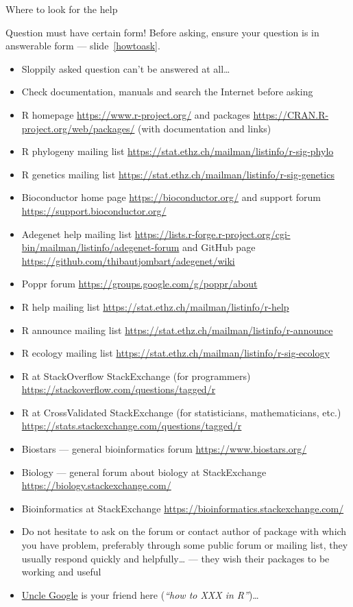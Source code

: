 \documentclass[compress, xelatex, 11pt, xcolor=svgnames, aspectratio=169, url={hyphens, lowtilde}]{beamer}
\begin{document}
\begin{frame}[allowframebreaks]{Where to look for the help}
	\label{help}
	\begin{alertblock}{Question must have certain form!}
			Before asking, \alert{ensure your question is in answerable form} --- slide~\ref{howtoask}.
		\begin{itemize}
			\item Sloppily asked question can't be answered at all\ldots
			\item Check documentation, manuals and search the Internet before asking
		\end{itemize}
	\end{alertblock}
	\begin{itemize}
		\item R homepage \url{https://www.r-project.org/} and packages \url{https://CRAN.R-project.org/web/packages/} (with documentation and links)
		\item R phylogeny mailing list \url{https://stat.ethz.ch/mailman/listinfo/r-sig-phylo}
		\item R genetics mailing list \url{https://stat.ethz.ch/mailman/listinfo/r-sig-genetics}
		\item Bioconductor home page \url{https://bioconductor.org/} and support forum \url{https://support.bioconductor.org/}
		\item Adegenet help mailing list \url{https://lists.r-forge.r-project.org/cgi-bin/mailman/listinfo/adegenet-forum} and GitHub page \url{https://github.com/thibautjombart/adegenet/wiki}
		\item Poppr forum \url{https://groups.google.com/g/poppr/about}
		\item R help mailing list \url{https://stat.ethz.ch/mailman/listinfo/r-help}
		\item R announce mailing list \url{https://stat.ethz.ch/mailman/listinfo/r-announce}
		\item R ecology mailing list \url{https://stat.ethz.ch/mailman/listinfo/r-sig-ecology}
		\item R at StackOverflow StackExchange (for programmers) \url{https://stackoverflow.com/questions/tagged/r}
		\item R at CrossValidated StackExchange (for statisticians, mathematicians, etc.) \url{https://stats.stackexchange.com/questions/tagged/r}
		\item Biostars --- general bioinformatics forum \url{https://www.biostars.org/}
		\item Biology --- general forum about biology at StackExchange \url{https://biology.stackexchange.com/}
		\item Bioinformatics at StackExchange \url{https://bioinformatics.stackexchange.com/}
		\item Do not hesitate to ask on the forum or contact author of package with which you have problem, preferably through some public forum or mailing list, they usually respond quickly and helpfully\ldots{ }--- they wish their packages to be working and useful
		\item \href{https://rseek.org/}{Uncle Google} is your friend here (\textit{\enquote{how to XXX in R}})\ldots
	\end{itemize}
\end{frame}
\end{document}
